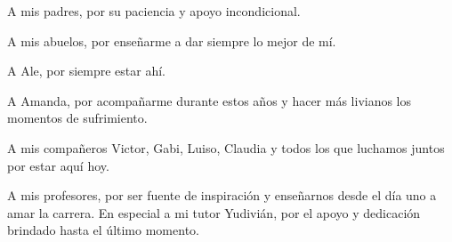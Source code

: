 \begin{acknowledgements}
    
    A mis padres, por su paciencia y apoyo incondicional.

    A mis abuelos, por enseñarme a dar siempre lo mejor de mí.
    
    A Ale, por siempre estar ahí.
    
    A Amanda, por acompañarme durante estos años y hacer más livianos los momentos de sufrimiento.
    
    A mis compañeros Victor, Gabi, Luiso, Claudia y todos los que luchamos juntos por estar aquí hoy.
    
    A mis profesores, por ser fuente de inspiración y enseñarnos desde el día uno a amar la carrera. En especial a mi tutor Yudivián, por el apoyo y dedicación brindado hasta el último momento.

\end{acknowledgements}